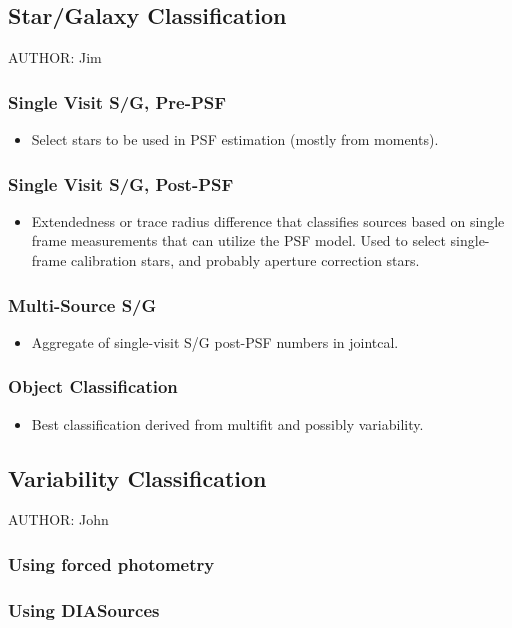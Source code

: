 \subsection{Star/Galaxy Classification}
AUTHOR: Jim
\subsubsection{Single Visit S/G, Pre-PSF}
\begin{itemize}
\item Select stars to be used in PSF estimation (mostly from moments).
\end{itemize}
\subsubsection{Single Visit S/G, Post-PSF}
\begin{itemize}
\item Extendedness or trace radius difference that classifies sources based on single frame measurements that can utilize the PSF model.  Used to select single-frame calibration stars, and probably aperture correction stars.
\end{itemize}
\subsubsection{Multi-Source S/G}
\begin{itemize}
\item Aggregate of single-visit S/G post-PSF numbers in jointcal.
\end{itemize}
\subsubsection{Object Classification}
\begin{itemize}
\item Best classification derived from multifit and possibly variability.
\end{itemize}

\subsection{Variability Classification}
AUTHOR: John
\subsubsection{Using forced photometry}
\subsubsection{Using DIASources}

